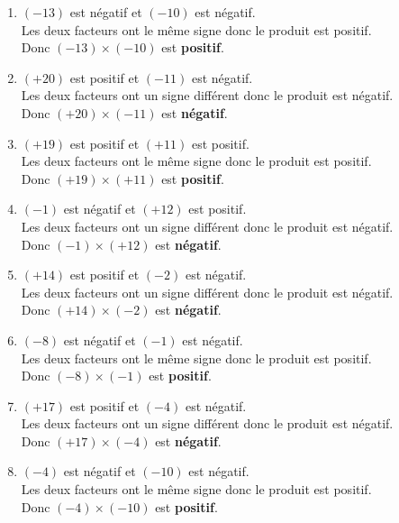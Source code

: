 \begin{corrige}
    \phantom{rrr}    
        \begin{enumerate}
            \item $ (-13) $ est négatif et $ (-10) $ est négatif.\\
            Les deux facteurs ont le même signe donc le produit est positif.\\
           Donc $ (-13) \times (-10) $ est {\bfseries \color[HTML]{f15929}positif}.
               \item $ (+20) $ est positif et $ (-11) $ est négatif.\\
            Les deux facteurs ont un signe différent donc le produit est négatif.\\
           Donc $ (+20) \times (-11) $ est {\bfseries \color[HTML]{f15929}négatif}.
               \item $ (+19) $ est positif et $ (+11) $ est positif.\\
            Les deux facteurs ont le même signe donc le produit est positif.\\
           Donc $ (+19) \times (+11) $ est {\bfseries \color[HTML]{f15929}positif}.
               \item $ (-1) $ est négatif et $ (+12) $ est positif.\\
            Les deux facteurs ont un signe différent donc le produit est négatif.\\
           Donc $ (-1) \times (+12) $ est {\bfseries \color[HTML]{f15929}négatif}.
               \item $ (+14) $ est positif et $ (-2) $ est négatif.\\
            Les deux facteurs ont un signe différent donc le produit est négatif.\\
           Donc $ (+14) \times (-2) $ est {\bfseries \color[HTML]{f15929}négatif}.
               \item $ (-8) $ est négatif et $ (-1) $ est négatif.\\
            Les deux facteurs ont le même signe donc le produit est positif.\\
           Donc $ (-8) \times (-1) $ est {\bfseries \color[HTML]{f15929}positif}.
               \item $ (+17) $ est positif et $ (-4) $ est négatif.\\
            Les deux facteurs ont un signe différent donc le produit est négatif.\\
           Donc $ (+17) \times (-4) $ est {\bfseries \color[HTML]{f15929}négatif}.
               \item $ (-4) $ est négatif et $ (-10) $ est négatif.\\
            Les deux facteurs ont le même signe donc le produit est positif.\\
           Donc $ (-4) \times (-10) $ est {\bfseries \color[HTML]{f15929}positif}.
        \end{enumerate}
\end{corrige}